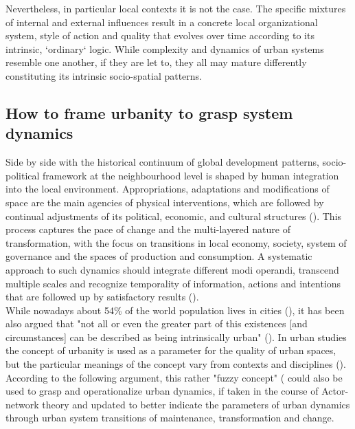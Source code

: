 \documentclass[11pt]{report}
\begin{document}
Nevertheless, in particular local contexts it is not the case. The specific mixtures of internal and external influences result in a concrete local organizational system, style of action and quality that evolves over time according to its intrinsic, `ordinary` logic.
While complexity and dynamics of urban systems resemble one another, if they are let to, they all may mature differently constituting its intrinsic socio-spatial patterns.

\subsection{How to frame urbanity to grasp system dynamics}

Side by side with the historical continuum of global development patterns, socio-political framework at the neighbourhood level is shaped by human integration into the local environment.
Appropriations, adaptations and modifications of space are the main agencies of physical interventions, which are followed by continual adjustments of its political, economic, and cultural structures (\href{Sykola}{\citealt{Sykora 1999}}).
This process captures the pace of change and the multi-layered nature of transformation, with the focus on transitions in local economy, society, system of governance and the spaces of production and consumption.
A systematic approach to such dynamics should integrate different modi operandi, transcend multiple scales and recognize temporality of information, actions and intentions that are followed up by satisfactory results (\href{Tardin}{\citealt{Tardin 2014}}).
\\

While nowadays about 54\% of the world population lives in cities (\href{UN}{\citealt{_world_2016}}), it has been also argued that "not all or even the greater part of this existences [and circumstances] can be described as being intrinsically urban"
(\href{Scott}{\citealt{scott_xxx_2015}}).
In urban studies the concept of urbanity is used as a parameter for the quality of urban spaces, but the particular meanings of the concept vary from contexts and disciplines (\citealt{(Bisson 2016}).
According to the following argument, this rather "fuzzy concept" (\cite{Bourdin, 2010} could also be used to grasp and operationalize urban dynamics, if taken in the course of Actor-network theory and updated to better indicate the parameters of urban dynamics through urban system transitions of maintenance, transformation and change.
\\
\end{document}
